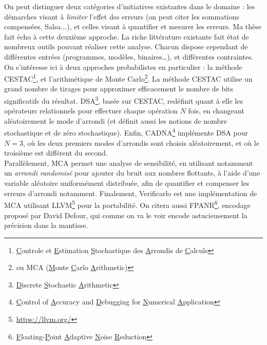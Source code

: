 \documentclass[a4paper,11pt]{article}
\begin{document}
On peut distinguer deux catégories d'initiatives existantes dans le domaine : les démarches visant à \textit{limiter} l’effet des erreurs (on peut citer les sommations compensées\cite{Demmel2006ErrorBF}, Salsa\cite{damouche2016amelioration}...), et celles visant à quantifier et mesurer les erreurs.
Ma thèse fait écho à cette deuxième approche.
La riche littérature existante fait état de nombreux outils pouvant réaliser cette analyse. Chacun dispose cependant de différentes entrées (programmes, modèles, binaires…), et différentes contraintes.
On s’intéresse ici à deux approches probabilistes en particulier : la méthode CESTAC\footnote{\underline{C}ontrole et \underline{E}stimation \underline{S}tochastique des \underline{A}rrondis de \underline{C}alculs}, et l’arithmétique de Monte Carlo\footnote{ou MCA (\underline{M}onte \underline{C}arlo \underline{A}rithmetic)}.
La méthode CESTAC\cite{pichat1993ingenierie} utilise un grand nombre de tirages pour approximer efficacement le nombre de bits significatifs du résultat.
DSA\footnote{\underline{D}iscrete \underline{S}tochastic \underline{A}rithmetic}\cite{vignes2004discrete}, basée sur CESTAC, redéfinit quant à elle les opérateurs relationnels pour effectuer chaque opération $N$ fois, en changeant aléatoirement le mode d’arrondi (et définit aussi les notions de nombre stochastique et de zéro stochastique).
Enfin, CADNA\footnote{\underline{C}ontrol of \underline{A}ccuracy and \underline{D}ebugging for \underline{N}umerical \underline{A}pplication}\cite{jezequel2008cadna} implémente DSA pour $N=3$, où les deux premiers modes d’arrondis sont choisis aléatoirement, et où le troisième est différent du second. \\
Parallèlement, MCA\cite{parker1997monte} permet une analyse de sensibilité, en utilisant notamment un \textit{arrondi randomisé} pour ajouter du bruit aux nombres flottants, à l'aide d'une variable aléatoire uniformément distribuée, afin de quantifier et compenser les erreurs d'arrondi notamment.
Finalement, Verificarlo\cite{denis2015verificarlo} est une implémentation de MCA utilisant LLVM\footnote{\url{https://llvm.org/}} pour la portabilité.
On citera aussi FPANR\footnote{\underline{F}loating-\underline{P}oint \underline{A}daptive \underline{N}oise \underline{R}eduction}\cite{defour2018fp}, encodage proposé par David Defour, qui comme on va le voir encode astucieusement la précision dans la mantisse.

\end{document}
